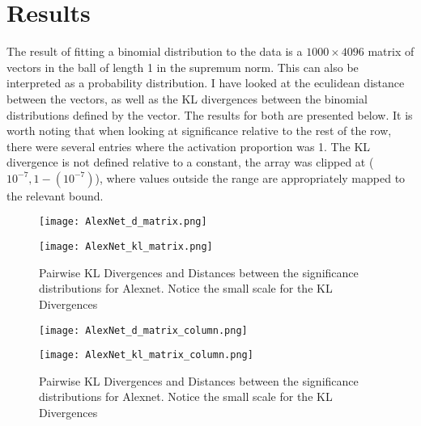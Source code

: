 \documentclass{article}
\begin{document}
        \section*{Results}
            The result of fitting a binomial distribution to the data is a $1000 \times 4096$ matrix of vectors in the ball of length 1 in the supremum norm. This can also be interpreted as a probability distribution. I have looked at the eculidean distance between the vectors, as well as the KL divergences between the binomial distributions defined by the vector. The results for both are presented below. It is worth noting that when looking at significance relative to the rest of the row, there were several entries where the activation proportion was 1. The KL divergence is not defined relative to a constant, the array was clipped at ($10^{-7}, 1 - (10^{-7})$), where values outside the range are appropriately mapped to the relevant bound.
            \begin{figure}[ht]
                \centering
                \begin{minipage}{\textwidth}
                    \centering
                    \texttt{[image: AlexNet\_d\_matrix.png]} %
                    
                \end{minipage}\hfill
                \begin{minipage}{\textwidth}
                    \centering
                    \texttt{[image: AlexNet\_kl\_matrix.png]} %
                \end{minipage}
                \caption{Pairwise KL Divergences and Distances between the significance distributions for Alexnet. Notice the small scale for the KL Divergences}
                \label{fig1}
            \end{figure}
            \begin{figure}[ht]
                \centering
                \begin{minipage}{\textwidth}
                    \centering
                    \texttt{[image: AlexNet\_d\_matrix\_column.png]} %
                    
                \end{minipage}\hfill
                \begin{minipage}{\textwidth}
                    \centering
                    \texttt{[image: AlexNet\_kl\_matrix\_column.png]} %
                \end{minipage}
                \caption{Pairwise KL Divergences and Distances between the significance distributions for Alexnet. Notice the small scale for the KL Divergences}
                \label{fig1}
            \end{figure}
            
\end{document}
